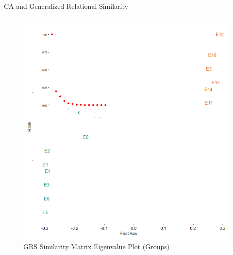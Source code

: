 \documentclass[
  ignorenonframetext,
]{beamer}
\begin{document}
\begin{frame}{CA and Generalized Relational Similarity}
\begin{columns}[T]
\begin{column}{0.5\textwidth}
\begin{figure}
{\centering \includegraphics{Plots/grs-plot-eigen-g.png}

}

\caption{GRS Similarity Matrix Eigenvalue Plot (Groups)}

\end{figure}
\end{column}
\end{columns}
\end{frame}
\end{document}
